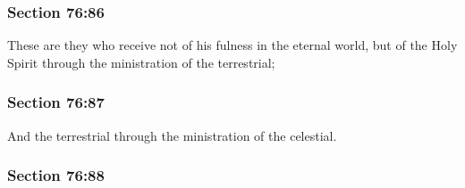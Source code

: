 
	\subsubsection{Section 76:86} %
		\label{DC76-86}

		These are they who receive not of his fulness in the eternal world, but of the Holy Spirit through the ministration of the terrestrial;


	\subsubsection{Section 76:87} %
		\label{DC76-87}

		And the terrestrial through the ministration of the celestial.


	\subsubsection{Section 76:88} %
		\label{DC76-88}

